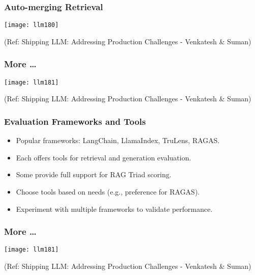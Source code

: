 \begin{frame}[fragile]\frametitle{Auto-merging Retrieval}

	\begin{center}
	\texttt{[image: llm180]}
	
	{\tiny (Ref: Shipping LLM: Addressing Production Challenges - Venkatesh \& Suman)}
	\end{center}   
\end{frame}

\begin{frame}[fragile]\frametitle{More \ldots}

	\begin{center}
	\texttt{[image: llm181]}
	
	{\tiny (Ref: Shipping LLM: Addressing Production Challenges - Venkatesh \& Suman)}
	\end{center}   
\end{frame}



\begin{frame}[fragile]\frametitle{Evaluation Frameworks and Tools}
  \begin{itemize}
    \item Popular frameworks: LangChain, LlamaIndex, TruLens, RAGAS.
    \item Each offers tools for retrieval and generation evaluation.
    \item Some provide full support for RAG Triad scoring.
    \item Choose tools based on needs (e.g., preference for RAGAS).
    \item Experiment with multiple frameworks to validate performance.
  \end{itemize}
\end{frame}

\begin{frame}[fragile]\frametitle{More \ldots}

	\begin{center}
	\texttt{[image: llm181]}
	
	{\tiny (Ref: Shipping LLM: Addressing Production Challenges - Venkatesh \& Suman)}
	\end{center}   
\end{frame}


